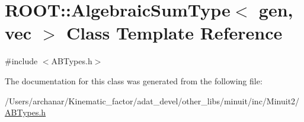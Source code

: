 \hypertarget{classROOT_1_1Minuit2_1_1AlgebraicSumType_3_01gen_00_01vec_01_4}{}\section{R\+O\+OT\+:\+:Algebraic\+Sum\+Type$<$ gen, vec $>$ Class Template Reference}
\label{classROOT_1_1Minuit2_1_1AlgebraicSumType_3_01gen_00_01vec_01_4}


{\ttfamily \#include $<$A\+B\+Types.\+h$>$}



The documentation for this class was generated from the following file\+:\begin{DoxyCompactItemize}
\item 
/\+Users/archanar/\+Kinematic\+\_\+factor/adat\+\_\+devel/other\+\_\+libs/minuit/inc/\+Minuit2/\mbox{\hyperlink{other__libs_2minuit_2inc_2Minuit2_2ABTypes_8h}{A\+B\+Types.\+h}}\end{DoxyCompactItemize}
